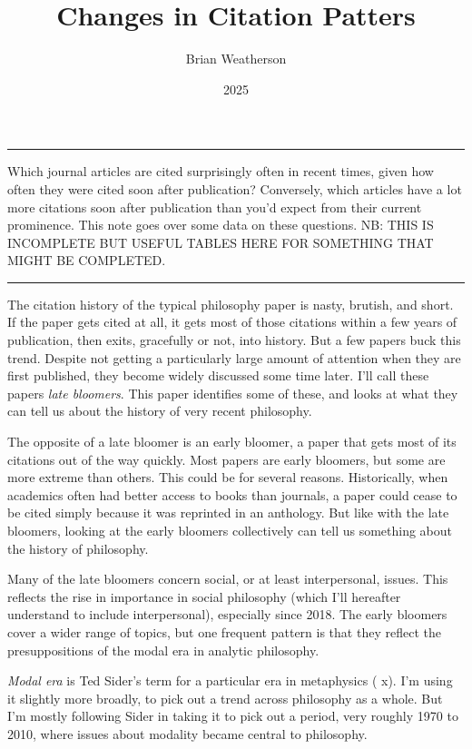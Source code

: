 \documentclass[
  10pt,
  letterpaper,
  DIV=11,
  numbers=noendperiod,
  twoside]{scrartcl}
\title{Changes in Citation Patters}
\author{Brian Weatherson}
\date{2025}
\renewenvironment{abstract}
 {\vspace{-1.25cm}
 \quotation\small\noindent\rule{\linewidth}{.5pt}\par\smallskip
 \noindent }
 {\par\noindent\rule{\linewidth}{.5pt}\endquotation}
\begin{document}
\maketitle
\begin{abstract}
Which journal articles are cited surprisingly often in recent times,
given how often they were cited soon after publication? Conversely,
which articles have a lot more citations soon after publication than
you'd expect from their current prominence. This note goes over some
data on these questions. NB: THIS IS INCOMPLETE BUT USEFUL TABLES HERE
FOR SOMETHING THAT MIGHT BE COMPLETED.
\end{abstract}


The citation history of the typical philosophy paper is nasty, brutish,
and short. If the paper gets cited at all, it gets most of those
citations within a few years of publication, then exits, gracefully or
not, into history. But a few papers buck this trend. Despite not getting
a particularly large amount of attention when they are first published,
they become widely discussed some time later. I'll call these papers
\emph{late bloomers}. This paper identifies some of these, and looks at
what they can tell us about the history of very recent philosophy.

The opposite of a late bloomer is an early bloomer, a paper that gets
most of its citations out of the way quickly. Most papers are early
bloomers, but some are more extreme than others. This could be for
several reasons. Historically, when academics often had better access to
books than journals, a paper could cease to be cited simply because it
was reprinted in an anthology. But like with the late bloomers, looking
at the early bloomers collectively can tell us something about the
history of philosophy.

Many of the late bloomers concern social, or at least interpersonal,
issues. This reflects the rise in importance in social philosophy (which
I'll hereafter understand to include interpersonal), especially since
2018. The early bloomers cover a wider range of topics, but one frequent
pattern is that they reflect the presuppositions of the modal era in
analytic philosophy.

\emph{Modal era} is Ted Sider's term for a particular era in metaphysics
( x). I'm using it slightly more
broadly, to pick out a trend across philosophy as a whole. But I'm
mostly following Sider in taking it to pick out a period, very roughly
1970 to 2010, where issues about modality became central to philosophy.
\end{document}
